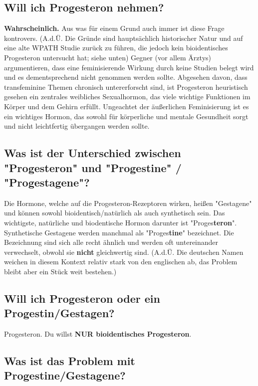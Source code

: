 \documentclass{article}
\begin{document}
\subsection{Will ich Progesteron nehmen?}

\textbf{Wahrscheinlich.} Aus was für einem Grund auch immer ist diese Frage kontrovers. (A.d.Ü. Die Gründe sind hauptsächlich historischer Natur und auf eine alte WPATH Studie zurück zu führen, die jedoch kein bioidentisches Progesteron untersucht hat; siehe unten) Gegner (vor allem Ärztys) argumentieren, dass eine feminisierende Wirkung durch keine Studien belegt wird und es dementsprechend nicht genommen werden sollte. Abgesehen davon, dass transfeminine Themen chronisch untererforscht sind, ist Progesteron heuristisch gesehen ein zentrales weibliches Sexualhormon, das viele wichtige Funktionen im Körper und dem Gehirn erfüllt. Ungeachtet der äußerlichen Feminisierung ist es ein wichtiges Hormon, das sowohl für körperliche und mentale Gesundheit sorgt und nicht leichtfertig übergangen werden sollte.

\subsection{Was ist der Unterschied zwischen "Progesteron" und "Progestine" / "Progestagene"?}

Die Hormone, welche auf die Progesteron-Rezeptoren wirken, heißen "Gestagene" und können sowohl bioidentisch/natürlich als auch synthetisch sein. Das wichtigste, natürliche und biodentische Hormon darunter ist "Proges\textbf{teron}". Synthetische Gestagene werden manchmal als "Proges\textbf{tine}" bezeichnet. Die Bezeichnung sind sich alle recht ähnlich und werden oft untereinander verwechselt, obwohl sie \textbf{nicht }gleichwertig sind. (A.d.Ü. Die deutschen Namen weichen in diesem Kontext relativ stark von den englischen ab, das Problem bleibt aber ein Stück weit bestehen.)

\subsection{Will ich Progesteron oder ein Progestin/Gestagen?}

Progesteron. Du willst \textbf{NUR bioidentisches Progesteron}.

\subsection{Was ist das Problem mit Progestine/Gestagene?}
\end{document}
